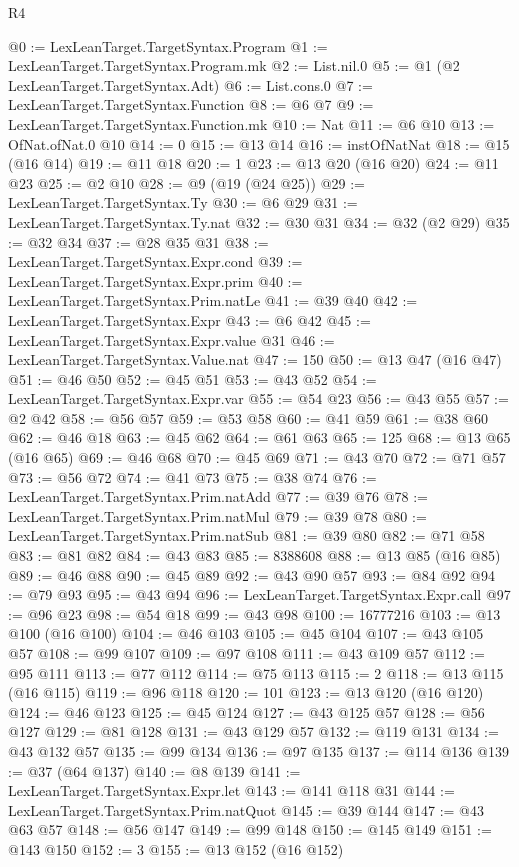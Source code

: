 \begin{lexlean}{R4}
\begin{coremodule}
@0 := LexLeanTarget.TargetSyntax.Program
@1 := LexLeanTarget.TargetSyntax.Program.mk
@2 := List.nil.{0}
@5 := @1 (@2 LexLeanTarget.TargetSyntax.Adt)
@6 := List.cons.{0}
@7 := LexLeanTarget.TargetSyntax.Function
@8 := @6 @7
@9 := LexLeanTarget.TargetSyntax.Function.mk
@10 := Nat
@11 := @6 @10
@13 := OfNat.ofNat.{0} @10
@14 := 0
@15 := @13 @14
@16 := instOfNatNat
@18 := @15 (@16 @14)
@19 := @11 @18
@20 := 1
@23 := @13 @20 (@16 @20)
@24 := @11 @23
@25 := @2 @10
@28 := @9 (@19 (@24 @25))
@29 := LexLeanTarget.TargetSyntax.Ty
@30 := @6 @29
@31 := LexLeanTarget.TargetSyntax.Ty.nat
@32 := @30 @31
@34 := @32 (@2 @29)
@35 := @32 @34
@37 := @28 @35 @31
@38 := LexLeanTarget.TargetSyntax.Expr.cond
@39 := LexLeanTarget.TargetSyntax.Expr.prim
@40 := LexLeanTarget.TargetSyntax.Prim.natLe
@41 := @39 @40
@42 := LexLeanTarget.TargetSyntax.Expr
@43 := @6 @42
@45 := LexLeanTarget.TargetSyntax.Expr.value @31
@46 := LexLeanTarget.TargetSyntax.Value.nat
@47 := 150
@50 := @13 @47 (@16 @47)
@51 := @46 @50
@52 := @45 @51
@53 := @43 @52
@54 := LexLeanTarget.TargetSyntax.Expr.var
@55 := @54 @23
@56 := @43 @55
@57 := @2 @42
@58 := @56 @57
@59 := @53 @58
@60 := @41 @59
@61 := @38 @60
@62 := @46 @18
@63 := @45 @62
@64 := @61 @63
@65 := 125
@68 := @13 @65 (@16 @65)
@69 := @46 @68
@70 := @45 @69
@71 := @43 @70
@72 := @71 @57
@73 := @56 @72
@74 := @41 @73
@75 := @38 @74
@76 := LexLeanTarget.TargetSyntax.Prim.natAdd
@77 := @39 @76
@78 := LexLeanTarget.TargetSyntax.Prim.natMul
@79 := @39 @78
@80 := LexLeanTarget.TargetSyntax.Prim.natSub
@81 := @39 @80
@82 := @71 @58
@83 := @81 @82
@84 := @43 @83
@85 := 8388608
@88 := @13 @85 (@16 @85)
@89 := @46 @88
@90 := @45 @89
@92 := @43 @90 @57
@93 := @84 @92
@94 := @79 @93
@95 := @43 @94
@96 := LexLeanTarget.TargetSyntax.Expr.call
@97 := @96 @23
@98 := @54 @18
@99 := @43 @98
@100 := 16777216
@103 := @13 @100 (@16 @100)
@104 := @46 @103
@105 := @45 @104
@107 := @43 @105 @57
@108 := @99 @107
@109 := @97 @108
@111 := @43 @109 @57
@112 := @95 @111
@113 := @77 @112
@114 := @75 @113
@115 := 2
@118 := @13 @115 (@16 @115)
@119 := @96 @118
@120 := 101
@123 := @13 @120 (@16 @120)
@124 := @46 @123
@125 := @45 @124
@127 := @43 @125 @57
@128 := @56 @127
@129 := @81 @128
@131 := @43 @129 @57
@132 := @119 @131
@134 := @43 @132 @57
@135 := @99 @134
@136 := @97 @135
@137 := @114 @136
@139 := @37 (@64 @137)
@140 := @8 @139
@141 := LexLeanTarget.TargetSyntax.Expr.let
@143 := @141 @118 @31
@144 := LexLeanTarget.TargetSyntax.Prim.natQuot
@145 := @39 @144
@147 := @43 @63 @57
@148 := @56 @147
@149 := @99 @148
@150 := @145 @149
@151 := @143 @150
@152 := 3
@155 := @13 @152 (@16 @152)

\end{coremodule}
\end{lexlean}

